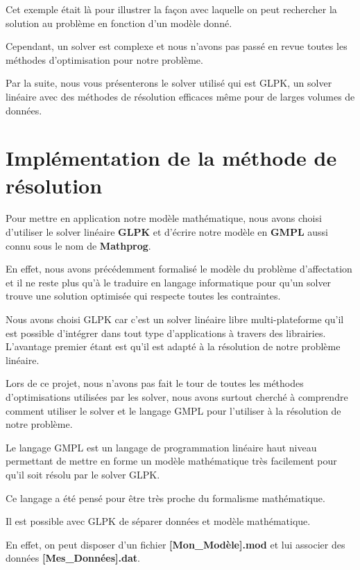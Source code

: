 \documentclass{polytech/polytech}
\begin{document}
Cet exemple était là pour illustrer la façon avec laquelle on peut rechercher la solution au problème en fonction d'un modèle donné.

Cependant, un solver est complexe et nous n'avons pas passé en revue toutes les méthodes d'optimisation pour notre problème.

Par la suite, nous vous présenterons le solver utilisé qui est GLPK, un solver linéaire avec des méthodes de résolution efficaces même pour de larges volumes de données.

\section{Implémentation de la méthode de résolution}

Pour mettre en application notre modèle mathématique, nous avons choisi d'utiliser le solver linéaire \textbf{GLPK} et d'écrire notre modèle en \textbf{GMPL} aussi connu sous le nom de \textbf{Mathprog}.

En effet, nous avons précédemment formalisé le modèle du problème d'affectation et il ne reste plus qu'à le traduire en langage informatique pour qu'un solver trouve une solution optimisée qui respecte toutes les contraintes.

Nous avons choisi GLPK car c'est un solver linéaire libre multi-plateforme qu'il est possible d'intégrer dans tout type d'applications à travers des librairies. L'avantage premier étant est qu'il est adapté à la résolution de notre problème linéaire.

Lors de ce projet, nous n'avons pas fait le tour de toutes les méthodes d'optimisations utilisées par les solver, nous avons surtout cherché à comprendre comment utiliser le solver et le langage GMPL pour l'utiliser à la résolution de notre problème.
 
Le langage GMPL est un langage de programmation linéaire haut niveau permettant de mettre en forme un modèle mathématique très facilement pour qu'il soit résolu par le solver GLPK.

Ce langage a été pensé pour être très proche du formalisme mathématique.

Il est possible avec GLPK de séparer données et modèle mathématique. 

En effet, on peut disposer d'un fichier \textbf{[Mon\_Modèle].mod} et lui associer des données \textbf{[Mes\_Données].dat}.
\end{document}
